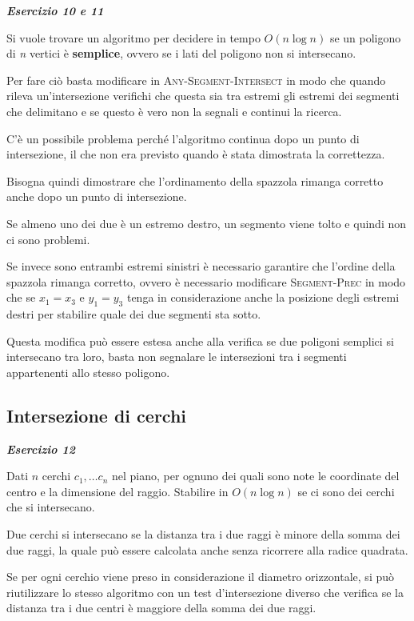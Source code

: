 \textit{\textbf{Esercizio 10 e 11}}

Si vuole trovare un algoritmo per decidere in tempo $O(n \log n)$ se un poligono di \emph{n} vertici è \textbf{semplice}, ovvero se i lati del poligono non si intersecano.

Per fare ciò basta modificare in \textsc{Any-Segment-Intersect} in modo che quando rileva un'intersezione verifichi che questa sia tra estremi gli estremi dei segmenti che delimitano e se questo è vero non la segnali e continui la ricerca. 

C'è un possibile problema perché l'algoritmo continua dopo un punto di intersezione, il che non era previsto quando è stata dimostrata la correttezza.

Bisogna quindi dimostrare che l'ordinamento della spazzola rimanga corretto anche dopo un punto di intersezione.

Se almeno uno dei due è un estremo destro, un segmento viene tolto e quindi non ci sono problemi. 

Se invece sono entrambi estremi sinistri è necessario garantire che l'ordine della spazzola rimanga corretto, ovvero è necessario modificare \textsc{Segment-Prec} in modo che se $x_1=x_3$ e $y_1=y_3$ tenga in considerazione anche la posizione degli estremi destri per stabilire quale dei due segmenti sta sotto.

Questa modifica può essere estesa anche alla verifica se due poligoni semplici si intersecano tra loro, basta non segnalare le intersezioni tra i segmenti appartenenti allo stesso poligono.

\subsection{Intersezione di cerchi}

\textbf{\textit{Esercizio 12}} 

Dati $n$ cerchi $c_1, \ldots c_n$ nel piano, per ognuno dei quali sono note le coordinate del centro e la dimensione del raggio.
Stabilire in $O(n \log n)$ se ci sono dei cerchi che si intersecano.

Due cerchi si intersecano se la distanza tra i due raggi è minore della somma dei due raggi, la quale può essere calcolata anche senza ricorrere alla radice quadrata.

Se per ogni cerchio viene preso in considerazione il diametro orizzontale, si può riutilizzare lo stesso algoritmo con un test d'intersezione diverso che verifica se la distanza tra i due centri è maggiore della somma dei due raggi.
